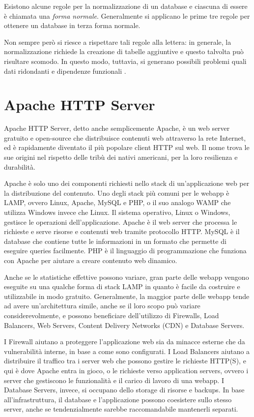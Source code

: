 Esistono alcune regole per la normalizzazione di un database e ciascuna di essere è chiamata una \textit{forma normale}. Generalmente si applicano le prime tre regole per ottenere un database in terza forma normale.

Non sempre però si riesce a rispettare tali regole alla lettera: in generale, la normalizzazione richiede la creazione di tabelle aggiuntive e questo talvolta può risultare scomodo. In questo modo, tuttavia, si generano possibili problemi quali dati ridondanti e dipendenze funzionali \cite{Database_Normalization}.

\section{Apache HTTP Server}
Apache HTTP Server, detto anche semplicemente Apache, è un web server gratuito e open-source che distribuisce contenuti web attraverso la rete Internet, ed è rapidamente diventato il più popolare client HTTP sul web. Il nome trova le sue origini nel rispetto delle tribù dei nativi americani, per la loro resilienza e durabilità.

Apache è solo uno dei componenti richiesti nello stack di un'applicazione web per la distribuzione del contenuto. Uno degli stack più comuni per le webapp è LAMP, ovvero Linux, Apache, MySQL e PHP, o il suo analogo WAMP che utilizza Windows invece che Linux. Il sistema operativo, Linux o Windows, gestisce le operazioni dell'applicazione. Apache è il web server che processa le richieste e serve risorse e contenuti web tramite protocollo HTTP. MySQL è il database che contiene tutte le informazioni in un formato che permette di eseguire queries facilmente. PHP è il linguaggio di programmazione che funziona con Apache per aiutare a creare contenuto web dinamico.

Anche se le statistiche effettive possono variare, gran parte delle webapp vengono eseguite su una qualche forma di stack LAMP in quanto è facile da costruire e utilizzabile in modo gratuito. Generalmente, la maggior parte delle webapp tende ad avere un'architettura simile, anche se il loro scopo può variare considerevolmente, e possono beneficiare dell'utilizzo di Firewalls, Load Balancers, Web Servers, Content Delivery Networks (CDN) e Database Servers.

I Firewall aiutano a proteggere l'applicazione web sia da minacce esterne che da vulnerabilità interne, in base a come sono configurati. I Load Balancers aiutano a distribuire il traffico tra i server web che possono gestire le richieste HTTP(S), e qui è dove Apache entra in gioco, o le richieste verso application servers, ovvero i server che gestiscono le funzionalità e il carico di lavoro di una webapp. I Database Servers, invece, si occupano dello storage di risorse e backups. In base all'infrastruttura, il database e l'applicazione possono coesistere sullo stesso server, anche se tendenzialmente sarebbe raccomandabile mantenerli separati.


